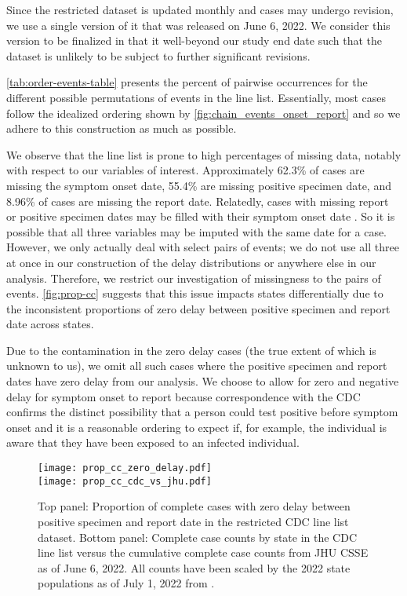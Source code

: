 Since the restricted dataset is updated
monthly and cases may undergo revision, we use a single version of it that was
released on June 6, 2022. We consider this version to be finalized in that it
well-beyond our study end date such that the dataset is unlikely to be subject
to further significant revisions.

\autoref{tab:order-events-table} presents the percent of pairwise occurrences
for the different possible permutations of events in the line list. Essentially,
most cases follow the idealized ordering shown by
\autoref{fig:chain_events_onset_report} and so we adhere to this construction as
much as possible.

We observe that the line list is prone to high percentages of missing data,
notably with respect to our variables of interest. Approximately 62.3\% of cases
are missing the symptom onset date, 55.4\% are missing positive specimen date,
and 8.96\% of cases are missing the report date. Relatedly,
cases with
missing report or positive specimen dates may be filled with their symptom onset date
\citep{jahja2022real}. So it is possible that all three variables may be
imputed with the same date for a case. However, we only actually deal with
select pairs of events; we do not use all three at once in our construction of
the delay distributions or anywhere else in our analysis. Therefore, we restrict
our investigation of missingness to the pairs of events.
\autoref{fig:prop-cc} suggests that this issue impacts states
differentially due to the inconsistent proportions of zero delay between
positive specimen and report date across states. 

Due to the contamination in the zero delay cases (the true extent of which is
unknown to us), we omit all such cases where the positive specimen and report
dates have zero delay from our analysis. We choose to allow for zero and
negative delay for symptom onset to report because correspondence with the CDC
confirms the distinct possibility that a person could test positive before
symptom onset and it is a reasonable ordering to expect if, for example, the
individual is aware that they have been exposed to an infected individual.

\begin{figure}[!tb]
\centering
\texttt{[image: prop\_cc\_zero\_delay.pdf]}\\
\texttt{[image: prop\_cc\_cdc\_vs\_jhu.pdf]} 
\caption{Top panel: Proportion of complete cases with zero delay between
    positive specimen and report date in the restricted CDC line list dataset.
    Bottom panel: Complete case counts by state in the CDC line list versus the
    cumulative complete case counts from JHU CSSE as of June 6, 2022. All
    counts have been scaled by the 2022 state populations as of July 1, 2022
    from \citep{uscensus2022annual}.}
\label{fig:prop-cc}
\end{figure}

